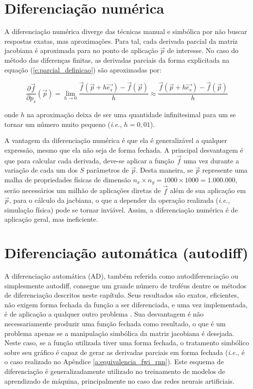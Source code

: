   \section{Diferenciação numérica} \label{s:diferenciacao_numerica}

    A diferenciação numérica diverge das técnicas manual e simbólica por não buscar respostas exatas, mas aproximações. Para tal, cada derivada parcial da matriz jacobiana é aproximada para no ponto de aplicação $\vec{p}$ de interesse. No caso do método das diferenças finitas, as derivadas parciais da forma explicitada na equação (\ref{e:parcial_definicao}) são aproximadas por:

    \begin{equation} \label{e:parcial_aproximada_diff_finitas}
      \frac{\partial \vec{f}}{\partial p_s}(\vec{p})
      =
      \lim_{h \to 0} \frac{\vec{f}(\vec{p} + h \vec{e_s}) - \vec{f}(\vec{p})}{h}
      \approx
      \frac{\vec{f}(\vec{p} + h \vec{e_s}) - \vec{f}(\vec{p})}{h}
    \end{equation}

    \noindent onde $h$ na aproximação deixa de ser uma quantidade infinitesimal para um se tornar um número muito pequeno (\textit{i.e.}, $h=0,01$).

    A vantagem da diferenciação numérica é que ela é generalizável a qualquer expressão, mesmo que ela não seja de forma fechada. A principal desvantagem é que para calcular cada derivada, deve-se aplicar a função $\vec{f}$ uma vez durante a variação de cada um dos $S$ parâmetros de $\vec{p}$. Desta maneira, se $\vec{p}$ represente uma malha de propriedades físicas de dimensão $n_x\times n_y = 1000 \times 1000 = 1.000.000$, serão necessários um milhão de aplicações diretas de $\vec{f}$ além de sua aplicação em $\vec{p}$, para o cálculo da jacbiana, o que a depender da operação realizada (\textit{i.e.}, simulação física) pode se tornar inviável. Assim, a diferenciação numérica é de aplicação geral, mas ineficiente.

  \section{Diferenciação automática (autodiff)}


    A diferenciação automática (AD), também referida como autodiferenciação ou simplesmente autodiff, consegue um grande número de troféus dentre os métodos de diferenciação descritos neste capítulo. Seus resultados são exatos, eficientes, não exigem forma fechada da função a ser diferenciada, e uma vez implementada, é de aplicação a qualquer outro problema . Sua desvantagem é não necessariamente produzir uma função fechada como resultado, o que é um problema apenas se a manipulação simbólica da matriz jacobiana é desejada. Neste caso, se a função utilizada tiver uma forma fechada, o tratamento simbólico sobre seu gráfico é capaz de gerar as derivadas parciais em forma fechada (\textit{i.e.}, é o caso realizado no Apêndice \ref{a:equivalencia_fwi_rnn}). Este esquema de diferenciação é generalizadamente utilizado no treinamento de modelos de aprendizado de máquina, principalmente no caso das redes neurais artificiais.

